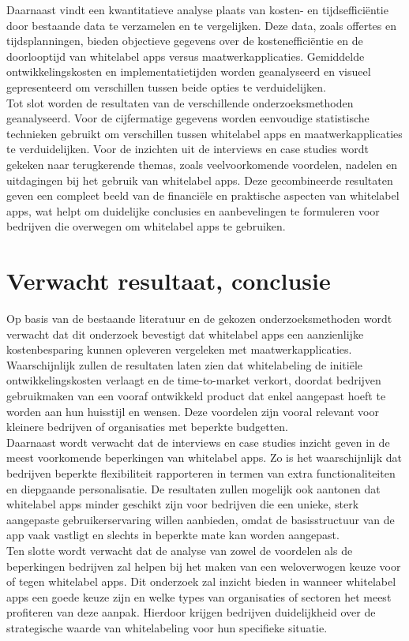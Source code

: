 Daarnaast vindt een kwantitatieve analyse plaats van kosten- en tijdsefficiëntie door bestaande data te verzamelen en te vergelijken. 
Deze data, zoals offertes en tijdsplanningen, bieden objectieve gegevens over de kostenefficiëntie en de doorlooptijd van whitelabel apps versus maatwerkapplicaties. 
Gemiddelde ontwikkelingskosten en implementatietijden worden geanalyseerd en visueel gepresenteerd om verschillen tussen beide opties te verduidelijken.\\

Tot slot worden de resultaten van de verschillende onderzoeksmethoden geanalyseerd. Voor de cijfermatige gegevens worden eenvoudige statistische technieken gebruikt om verschillen tussen whitelabel apps en maatwerkapplicaties te verduidelijken. 
Voor de inzichten uit de interviews en case studies wordt gekeken naar terugkerende thema\textquotesingle s, zoals veelvoorkomende voordelen, nadelen en uitdagingen bij het gebruik van whitelabel apps. Deze gecombineerde resultaten geven een compleet beeld van de financiële en praktische aspecten van whitelabel apps, wat helpt om duidelijke conclusies en aanbevelingen te formuleren voor bedrijven die overwegen om whitelabel apps te gebruiken.

\section{Verwacht resultaat, conclusie}%
\label{sec:verwachte_resultaten}

Op basis van de bestaande literatuur en de gekozen onderzoeksmethoden wordt verwacht dat dit onderzoek bevestigt dat whitelabel apps een aanzienlijke kostenbesparing kunnen opleveren vergeleken met maatwerkapplicaties. 
Waarschijnlijk zullen de resultaten laten zien dat whitelabeling de initiële ontwikkelingskosten verlaagt en de time-to-market verkort, doordat bedrijven gebruikmaken van een vooraf ontwikkeld product dat enkel aangepast hoeft te worden aan hun huisstijl en wensen. 
Deze voordelen zijn vooral relevant voor kleinere bedrijven of organisaties met beperkte budgetten.\\

Daarnaast wordt verwacht dat de interviews en case studies inzicht geven in de meest voorkomende beperkingen van whitelabel apps. 
Zo is het waarschijnlijk dat bedrijven beperkte flexibiliteit rapporteren in termen van extra functionaliteiten en diepgaande personalisatie. 
De resultaten zullen mogelijk ook aantonen dat whitelabel apps minder geschikt zijn voor bedrijven die een unieke, sterk aangepaste gebruikerservaring willen aanbieden, omdat de basisstructuur van de app vaak vastligt en slechts in beperkte mate kan worden aangepast.\\

Ten slotte wordt verwacht dat de analyse van zowel de voordelen als de beperkingen bedrijven zal helpen bij het maken van een weloverwogen keuze voor of tegen whitelabel apps. 
Dit onderzoek zal inzicht bieden in wanneer whitelabel apps een goede keuze zijn en welke types van organisaties of sectoren het meest profiteren van deze aanpak. 
Hierdoor krijgen bedrijven duidelijkheid over de strategische waarde van whitelabeling voor hun specifieke situatie.
